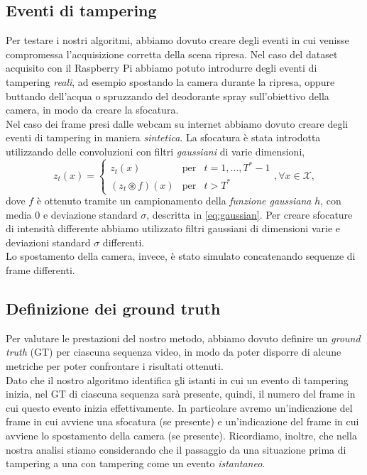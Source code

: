 \subsection{Eventi di tampering}
\label{tamperingSint}
Per testare i nostri algoritmi, abbiamo dovuto creare degli eventi in cui venisse compromessa l'acquisizione corretta della scena ripresa.
Nel caso del dataset acquisito con il Raspberry Pi abbiamo potuto introdurre degli eventi di tampering \textit{reali}, ad esempio spostando la camera durante la ripresa, oppure buttando dell'acqua o spruzzando del deodorante spray sull'obiettivo della camera, in modo da creare la sfocatura.\\
Nel caso dei frame presi dalle webcam su internet abbiamo dovuto creare degli eventi di tampering in maniera \textit{sintetica}.
La sfocatura \`e stata introdotta utilizzando delle convoluzioni con filtri \textit{gaussiani} di varie dimensioni,
\begin{equation}
\label{eq:blurArtificiale}
z_t(x) = \left\{ \begin{array}{ccl}
z_t(x) & \mbox{per} & t=1,\dots,T^* -1 \\
(z_t \circledast f)(x) & \mbox{per} & t > T^* 
\end{array}\right. , \forall x \in \mathcal{X},
\end{equation}
dove $f$ \`e ottenuto tramite un campionamento della \textit{funzione gaussiana} $h$, con media $0$ e deviazione standard $\sigma$, descritta in \eqref{eq:gaussian}.
Per creare sfocature di intensit\`a differente abbiamo utilizzato filtri gaussiani di dimensioni varie e deviazioni standard $\sigma$ differenti.\\
Lo spostamento della camera, invece, \`e stato simulato concatenando sequenze di frame differenti.
\subsection{Definizione dei ground truth}
Per valutare le prestazioni del nostro metodo, abbiamo dovuto definire un \textit{ground truth} (GT) per ciascuna sequenza video, in modo da poter disporre di alcune metriche per poter confrontare i risultati ottenuti.\\
Dato che il nostro algoritmo identifica gli istanti in cui un evento di tampering inizia, nel GT di ciascuna sequenza sar\`a presente, quindi, il numero del frame in cui questo evento inizia effettivamente. 
In particolare avremo un'indicazione del frame in cui avviene una sfocatura (se presente) e un'indicazione del frame in cui avviene lo spostamento della camera (se presente).
Ricordiamo, inoltre, che nella nostra analisi stiamo considerando che il passaggio da una situazione prima di tampering a una con tampering come un evento \textit{istantaneo}. 
